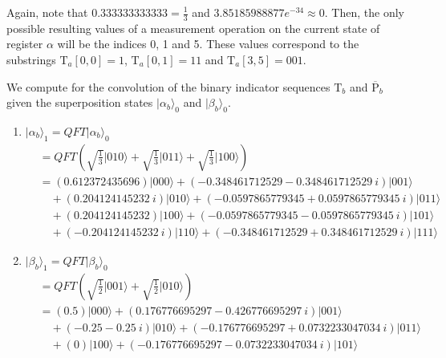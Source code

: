 \begin{example}
Again, note that $0.333333333333 = \frac{1}{3}$ and $3.85185988877e^{-34} \approx 0$. Then, the only possible resulting values of a measurement operation on the current state of register $\alpha$ will be the indices 0, 1 and 5. These values correspond to the substrings $\text{T}_a[0, 0] = 1$, $\text{T}_a[0,1] = 11$ and $\text{T}_a[3,5] = 001$.
\end{example}

\begin{example}
\label{exa:aqc-b}
We compute for the convolution of the binary indicator sequences $\text{T}_b$ and $\overline{\text{P}}_b$ given the superposition states $\vert \alpha_b \rangle_0$ and $\vert \beta_b \rangle_0$.
\begin{enumerate}
	\item $\vert \alpha_{b} \rangle_1 = QFT\vert \alpha_{b} \rangle_0 $
		\begin{align*}
			&= QFT \left( \sqrt{\frac{1}{3}}\vert 010 \rangle + \sqrt{\frac{1}{3}}\vert 011 \rangle + \sqrt{\frac{1}{3}}\vert 100 \rangle \right) \\
			&= \left(0.612372435696 \right) \vert 000 \rangle + \left( -0.348461712529 - 0.348461712529\ i \right) \vert 001 \rangle\\
			& \quad + \left( 0.204124145232\ i \right) \vert 010 \rangle + \left( -0.0597865779345 + 0.0597865779345\ i \right) \vert 011 \rangle\\
			& \quad + \left( 0.204124145232 \right) \vert 100 \rangle + \left( -0.0597865779345 - 0.0597865779345\ i \right) \vert 101 \rangle\\
			& \quad + \left( -0.204124145232\ i \right) \vert 110 \rangle + \left( -0.348461712529 + 0.348461712529\ i \right) \vert 111 \rangle
		\end{align*}
	\item $\vert \beta_{b} \rangle_1 = QFT\vert \beta_{b} \rangle_0$
		\begin{align*}
			&= QFT \left( \sqrt{\frac{1}{2}}\vert 001 \rangle + \sqrt{\frac{1}{2}}\vert 010 \rangle \right)\\
			&= \left( 0.5 \right) \vert 000 \rangle + \left( 0.176776695297 - 0.426776695297\ i \right) \vert 001 \rangle\\
			& \quad + \left( -0.25 - 0.25\ i \right) \vert 010 \rangle + \left( -0.176776695297 + 0.0732233047034\ i \right) \vert 011 \rangle\\
			& \quad + \left( 0 \right) \vert 100 \rangle + \left( -0.176776695297 - 0.0732233047034\ i \right) \vert 101 \rangle\\

\end{align*}
\end{enumerate}
\end{example}
